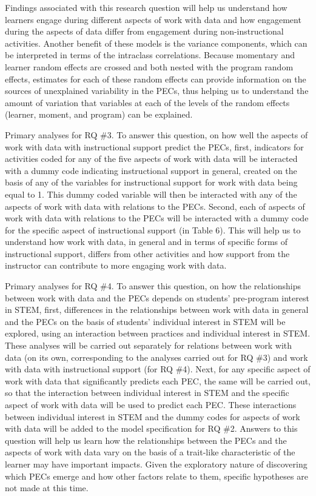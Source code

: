 \documentclass[]{book}
\theoremstyle{definition}
\theoremstyle{definition}
\theoremstyle{definition}
\theoremstyle{remark}
\begin{document}
Findings associated with this research question will help us understand
how learners engage during different aspects of work with data and how
engagement during the aspects of data differ from engagement during
non-instructional activities. Another benefit of these models is the
variance components, which can be interpreted in terms of the intraclass
correlations. Because momentary and learner random effects are crossed
and both nested with the program random effects, estimates for each of
these random effects can provide information on the sources of
unexplained variability in the PECs, thus helping us to understand the
amount of variation that variables at each of the levels of the random
effects (learner, moment, and program) can be explained.

Primary analyses for RQ \#3. To answer this question, on how well the
aspects of work with data with instructional support predict the PECs,
first, indicators for activities coded for any of the five aspects of
work with data will be interacted with a dummy code indicating
instructional support in general, created on the basis of any of the
variables for instructional support for work with data being equal to 1.
This dummy coded variable will then be interacted with any of the
aspects of work with data with relations to the PECs. Second, each of
aspects of work with data with relations to the PECs will be interacted
with a dummy code for the specific aspect of instructional support (in
Table 6). This will help us to understand how work with data, in general
and in terms of specific forms of instructional support, differs from
other activities and how support from the instructor can contribute to
more engaging work with data.

Primary analyses for RQ \#4. To answer this question, on how the
relationships between work with data and the PECs depends on students'
pre-program interest in STEM, first, differences in the relationships
between work with data in general and the PECs on the basis of students'
individual interest in STEM will be explored, using an interaction
between practices and individual interest in STEM. These analyses will
be carried out separately for relations between work with data (on its
own, corresponding to the analyses carried out for RQ \#3) and work with
data with instructional support (for RQ \#4). Next, for any specific
aspect of work with data that significantly predicts each PEC, the same
will be carried out, so that the interaction between individual interest
in STEM and the specific aspect of work with data will be used to
predict each PEC. These interactions between individual interest in STEM
and the dummy codes for aspects of work with data will be added to the
model specification for RQ \#2. Answers to this question will help us
learn how the relationships between the PECs and the aspects of work
with data vary on the basis of a trait-like characteristic of the
learner may have important impacts. Given the exploratory nature of
discovering which PECs emerge and how other factors relate to them,
specific hypotheses are not made at this time.
\end{document}
